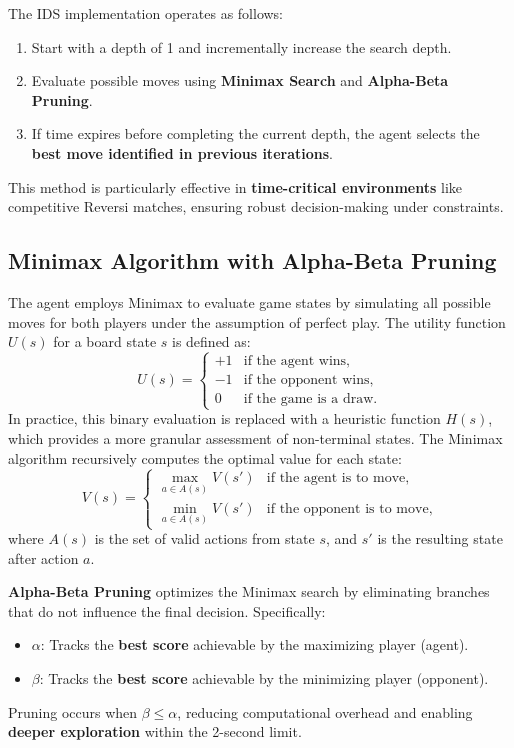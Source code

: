 \documentclass[11pt]{article}
\begin{document}
\noindent The IDS implementation operates as follows:
\begin{enumerate}
    \item Start with a depth of 1 and incrementally increase the search depth.
    \item Evaluate possible moves using \textbf{Minimax Search} and \textbf{Alpha-Beta Pruning}.
    \item If time expires before completing the current depth, the agent selects the \textbf{best move identified in previous iterations}.
\end{enumerate}

This method is particularly effective in \textbf{time-critical environments} like competitive Reversi matches, ensuring robust decision-making under constraints.

\subsection*{Minimax Algorithm with Alpha-Beta Pruning}
\noindent The agent employs Minimax to evaluate game states by simulating all possible moves for both players under the assumption of perfect play. The utility function \(U(s)\) for a board state \(s\) is defined as:
\[
U(s) = 
\begin{cases} 
+1 & \text{if the agent wins}, \\
-1 & \text{if the opponent wins}, \\
0 & \text{if the game is a draw}.
\end{cases}
\]
In practice, this binary evaluation is replaced with a heuristic function \(H(s)\), which provides a more granular assessment of non-terminal states. The Minimax algorithm recursively computes the optimal value for each state:
\[
V(s) = 
\begin{cases} 
\max_{a \in A(s)} V(s') & \text{if the agent is to move}, \\
\min_{a \in A(s)} V(s') & \text{if the opponent is to move},
\end{cases}
\]
where \(A(s)\) is the set of valid actions from state \(s\), and \(s'\) is the resulting state after action \(a\).

\noindent \textbf{Alpha-Beta Pruning} optimizes the Minimax search by eliminating branches that do not influence the final decision. Specifically:
\begin{itemize}
    \item \(\alpha\): Tracks the \textbf{best score} achievable by the maximizing player (agent).
    \item \(\beta\): Tracks the \textbf{best score} achievable by the minimizing player (opponent).
\end{itemize}
Pruning occurs when \(\beta \leq \alpha\), reducing computational overhead and enabling \textbf{deeper exploration} within the 2-second limit.
\end{document}
